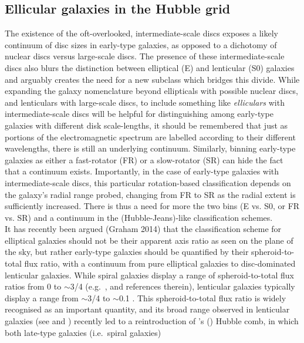 \documentclass[useAMS,usenatbib,article]{mn2e}
\begin{document}
\subsection{Ellicular galaxies in the Hubble grid}
The existence of the oft-overlooked, intermediate-scale discs
exposes a likely continuum of disc sizes in early-type
galaxies, as opposed to a dichotomy of nuclear discs versus large-scale
discs. The presence of these intermediate-scale discs also blurs the
distinction between elliptical (E) and lenticular (S0) galaxies and
arguably creates the need for a new subclass which bridges this
divide.  While expanding the galaxy nomenclature beyond ellipticals
with possible nuclear discs, and lenticulars with large-scale discs,
to include something like \emph{elliculars} with intermediate-scale
discs will be helpful for distinguishing among 
early-type galaxies with different disk scale-lengths, it should be
remembered that just as portions of the electromagnetic spectrum are
labelled according to their different wavelengths, there is still an
underlying continuum.  Similarly, binning early-type galaxies as
either a fast-rotator (FR) or a slow-rotator (SR) can hide the fact
that a continuum exists.  Importantly, in the case of early-type
galaxies with intermediate-scale discs, this particular
rotation-based classification depends on the galaxy's radial range probed, 
changing from FR to SR as the radial extent is sufficiently increased. 
There is thus a need for more the two bins (E vs. S0, or FR vs. SR) 
and a continuum in the (Hubble-Jeans)-like classification schemes. \\
It has recently been argued (Graham 2014) that the classification
scheme for elliptical galaxies should not be their apparent axis ratio
as seen on the plane of the sky, but rather early-type galaxies should
be quantified by their spheroid-to-total flux ratio, with a
continuum from pure elliptical galaxies to disc-dominated lenticular
galaxies.  While spiral galaxies display a range of spheroid-to-total flux ratios
from 0 to $\sim$3/4 (e.g.~\citealt{grahamworley2008}, and references
therein), lenticular galaxies typically display a range from
$\sim$3/4 to $\sim$0.1 \citep{laurikainen2010}.  This spheroid-to-total flux
ratio is widely recognised as an important quantity, and its broad range observed in
lenticular galaxies (see \citealt{cappellari2011kmdr-MNRAS} and \citealt{kormendybender2012}) recently led to a reintroduction of 
\citeauthor{vandenbergh1976}'s (\citeyear{vandenbergh1976})
Hubble comb, in which both late-type galaxies (i.e.~spiral galaxies)
\end{document}
